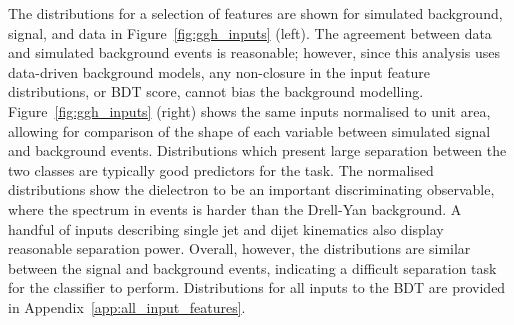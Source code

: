 \noindent The distributions for a selection of features are shown for simulated background, \ggH signal, and data in Figure~\ref{fig:ggh_inputs} (left). The agreement between data and simulated background events is reasonable; however, since this analysis uses data-driven background models, any non-closure in the input feature distributions, or BDT score, cannot bias the background modelling. Figure~\ref{fig:ggh_inputs} (right) shows the same inputs normalised to unit area, allowing for comparison of the shape of each variable between simulated \ggH signal and background events. Distributions which present large separation between the two classes are typically good predictors for the task. The normalised distributions show the dielectron \pt to be an important discriminating observable, where the \pt spectrum in \ggH events is harder than the Drell-Yan background. A handful of inputs describing single jet and dijet kinematics also display reasonable separation power. Overall, however, the distributions are similar between the \Hee signal and background events, indicating a difficult separation task for the classifier to perform. Distributions for all inputs to the \ggH BDT are provided in Appendix~\ref{app:all_input_features}.

